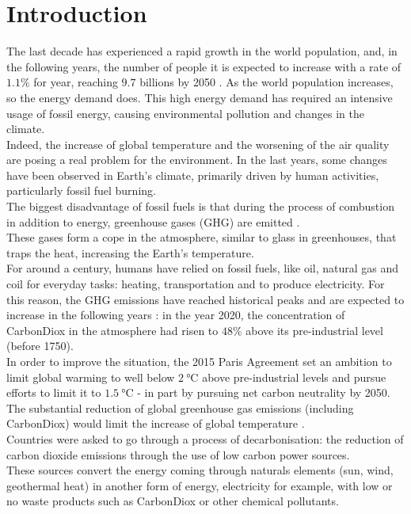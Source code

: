 \chapter{Introduction}
\label{ch1}

%
The last decade has experienced a rapid growth in the world population, and, in the following years, the number of people it is expected to increase with a rate of $1.1\%$ for year, reaching $9.7$ billions by 2050 \cite{wpp}. As the world population increases, so the energy demand does.
This high energy demand has required an intensive usage of fossil energy, causing environmental pollution and changes in the climate.\\ 
Indeed, the increase of global temperature and the worsening of the air quality are posing a real problem for the environment. In the last years, some changes have been observed in Earth’s climate, primarily driven by human activities, particularly fossil fuel burning. \\

The biggest disadvantage of fossil fuels is that during the process of combustion in addition to energy, greenhouse gases (\gls{GHG}) are emitted \cite{greenhousegasemissions}. \\
These gases form a cope in the atmosphere, similar to glass in greenhouses, that traps the heat, increasing the Earth's temperature. \\
For around a century, humans have relied on fossil fuels, like oil, natural gas and coil for everyday tasks: heating, transportation and to produce electricity. For this reason, the \gls{GHG} emissions have reached historical peaks and are expected to increase in the following years \cite{co2predic}: in the year 2020, the concentration of \gls{CarbonDiox} in the atmosphere had risen to $48\%$ above its pre-industrial level (before 1750). \\

In order to improve the situation, the 2015 Paris Agreement set an ambition to limit global warming to well below $\SI{2}{\degreeCelsius}$ above pre-industrial levels and pursue efforts to limit it to $\SI{1.5}{\degreeCelsius}$ - in part by pursuing net carbon neutrality by 2050. The substantial reduction of global greenhouse gas emissions (including \gls{CarbonDiox})  would limit the increase of global temperature \cite{french_conference}. \\
Countries were asked to go through a process of decarbonisation: the reduction of carbon dioxide emissions through the use of low carbon power sources. \\
These sources convert the energy coming through naturals elements (sun, wind, geothermal heat) in another form of energy, electricity for example, with low or no waste products such as \gls{CarbonDiox} or other chemical pollutants. 

